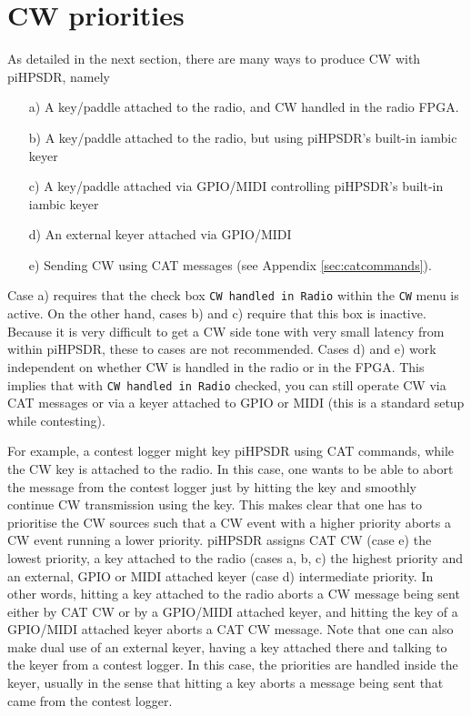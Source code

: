 \documentclass[12pt]{book}
\def\rett#1{\texttt{\color{red}#1}}
\def\bltt#1{\texttt{\color{blue}#1}}
\def\pH{pi\-HPSDR\xspace}
\begin{document}
\section{CW priorities}
As detailed in the next section, there are many ways to produce CW with \pH,
namely
\begin{itemize}
\item[a)]{A key/paddle attached to the radio, and CW handled in the radio FPGA.}
\item[b)]{A key/paddle attached to the radio, but using \pH's built-in iambic keyer}
\item[c)]{A key/paddle attached via GPIO/MIDI controlling \pH's built-in iambic keyer}
\item[d)]{An external keyer attached via GPIO/MIDI}
\item[e)]{Sending CW using CAT messages (see Appendix \ref{sec:catcommands}).}
\end{itemize}

Case a) requires that the check box \rett{CW handled in Radio} within the \bltt{CW} menu
is active. On the other hand, cases b) and c) require that this box is inactive.
Because it is very difficult to get a CW side tone with very small latency from
within \pH, these to cases are not recommended.
Cases
d) and e) work independent on whether CW is handled in the radio or in the FPGA.
This implies that with \rett{CW handled in Radio} checked,
you can still operate CW via CAT messages or via a keyer attached to GPIO or MIDI
(this is a standard setup while contesting).

For example, a contest logger might key \pH using CAT commands, while the CW key is
attached to the radio. In this case, one wants to be able to abort the message from the contest
logger just by hitting the key and smoothly continue CW transmission using the key. This
makes clear that one has to prioritise the CW sources such that a CW event with a higher
priority aborts a CW event running a lower priority. \pH assigns CAT CW (case e)
the lowest priority, a key attached to the radio (cases a, b, c) the highest priority
and an external, GPIO or MIDI attached keyer (case d) intermediate priority. In other words,
hitting a key attached to the radio aborts a CW message being sent either by CAT CW or
by a GPIO/MIDI attached keyer, and hitting the key of a GPIO/MIDI attached keyer aborts
a CAT CW message. Note that one can also make dual use of an external keyer, having a key
attached there and talking to the keyer from a contest logger. In this case, the priorities
are handled inside the keyer, usually in the sense that hitting a key aborts a message
being sent that came from the contest logger.
\end{document}
